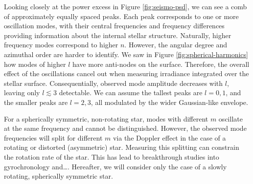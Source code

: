 Looking closely at the power excess in Figure \ref{fig:seismo-psd}, we can see a comb of approximately equally spaced peaks. Each peak corresponds to one or more oscillation modes, with their central frequencies and frequency differences providing information about the internal stellar structure. Naturally, higher frequency modes correspond to higher \(n\). However, the angular degree and azimuthal order are harder to identify. We saw in Figure \ref{fig:spherical-harmonics} how modes of higher \(l\) have more anti-nodes on the surface. Therefore, the overall effect of the oscillations cancel out when measuring irradiance integrated over the stellar surface. Consequentially, observed mode amplitude decreases with \(l\), leaving only \(l \lesssim 3\) detectable. 
We can assume the tallest peaks are \(l=0,1\), and the smaller peaks are \(l=2,3\), all modulated by the wider Gaussian-like envelope.

For a spherically symmetric, non-rotating star, modes with different \(m\) oscillate at the same frequency and cannot be distinguished. However, the observed mode frequencies will split for different \(m\) via the Doppler effect in the case of a rotating or distorted (asymmetric) star. Measuring this splitting can constrain the rotation rate of the star. This has lead to breakthrough studies into gyrochronology and\dots \citep[e.g.][]{Hall.Davies.ea2021}. Hereafter, we will consider only the case of a slowly rotating, spherically symmetric star.

